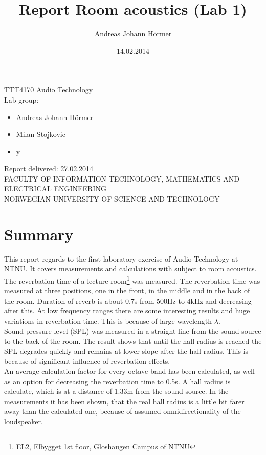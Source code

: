 \documentclass{article}
\title{Report Room acoustics (Lab 1)}
\author{Andreas Johann H\"ormer}
\date{14.02.2014}
\begin{document}
\thispagestyle{empty}
\maketitle
\thispagestyle{empty}
\begin{center}
TTT4170 Audio Technology\\[3cm]
Lab group:
\begin{itemize}
\item Andreas Johann H\"ormer
\item Milan Stojkovic
\item y\\[3cm]
\end{itemize}
Report delivered: 27.02.2014\\[6cm]
FACULTY OF INFORMATION TECHNOLOGY, MATHEMATICS AND ELECTRICAL ENGINEERING\\
NORWEGIAN UNIVERSITY OF SCIENCE AND TECHNOLOGY
\end{center}
\thispagestyle{empty}
\tableofcontents
\thispagestyle{empty}
\newpage
\section*{Summary}
\thispagestyle{empty}
This report regards to the first laboratory exercise of Audio Technology at NTNU. It covers measurements and calculations with subject to room acoustics.\\
The reverbation time of a lecture room\footnote{EL2, Elbygget 1st floor, Gloshaugen Campus of NTNU} was measured. The reverbation time was measured at three positions, one in the front, in the middle and in the back of the room. Duration of reverb is about 0.7s from 500Hz to 4kHz and decreasing after this. At low frequency ranges there are some interesting results and huge variations in reverbation time. This is because of large wavelength $\lambda$.\\
Sound pressure level (SPL) was measured in a straight line from the sound source to the back of the room. The result shows that until the hall radius is reached the SPL degrades quickly and remains at lower slope after the hall radius. This is because of significant influence of reverbation effects.\\
An average calculation factor for every octave band has been calculated, as well as an option for decreasing the reverbation time to 0.5s. A hall radius is calculate, which is at a distance of 1.33m from the sound source. In the measurements it has been shown, that the real hall radius is a little bit farer away than the calculated one, because of assumed omnidirectionality of the loudspeaker.
\newpage
\setcounter{page}{1}
\end{document}
